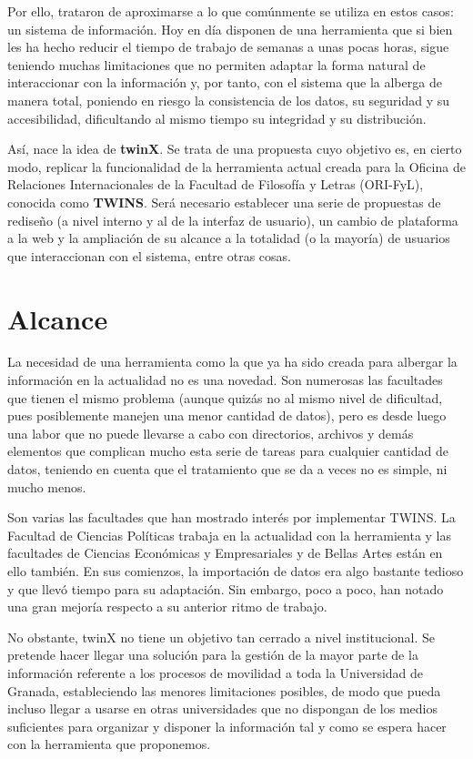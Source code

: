 Por ello, trataron de aproximarse a lo que comúnmente se utiliza en estos casos: un sistema de información. Hoy en día disponen de una herramienta que si bien les ha hecho reducir el tiempo de trabajo de semanas a unas pocas horas, sigue teniendo muchas limitaciones que no permiten adaptar la forma natural de interaccionar con la información y, por tanto, con el sistema que la alberga de manera total, poniendo en riesgo la consistencia de los datos, su seguridad y su accesibilidad, dificultando al mismo tiempo su integridad y su distribución.

Así, nace la idea de \textbf{twinX}. Se trata de una propuesta cuyo objetivo es, en cierto modo, replicar la funcionalidad de la herramienta actual creada para la Oficina de Relaciones Internacionales de la Facultad de Filosofía y Letras (ORI-FyL), conocida como \textbf{TWINS}. Será necesario establecer una serie de propuestas de rediseño (a nivel interno y al de la interfaz de usuario), un cambio de plataforma a la web y la ampliación de su alcance a la totalidad (o la mayoría) de usuarios que interaccionan con el sistema, entre otras cosas.

\section{Alcance}

La necesidad de una herramienta como la que ya ha sido creada para albergar la información en la actualidad no es una novedad. Son numerosas las facultades que tienen el mismo problema (aunque quizás no al mismo nivel de dificultad, pues posiblemente manejen una menor cantidad de datos), pero es desde luego una labor que no puede llevarse a cabo con directorios, archivos y demás elementos que complican mucho esta serie de tareas para cualquier cantidad de datos, teniendo en cuenta que el tratamiento que se da a veces no es simple, ni mucho menos.

Son varias las facultades que han mostrado interés por implementar TWINS. La Facultad de Ciencias Políticas trabaja en la actualidad con la herramienta y las facultades de Ciencias Económicas y Empresariales y de Bellas Artes están en ello también. En sus comienzos, la importación de datos era algo bastante tedioso y que llevó tiempo para su adaptación. Sin embargo, poco a poco, han notado una gran mejoría respecto a su anterior ritmo de trabajo.

No obstante, twinX no tiene un objetivo tan cerrado a nivel institucional. Se pretende hacer llegar una solución para la gestión de la mayor parte de la información referente a los procesos de movilidad a toda la Universidad de Granada, estableciendo las menores limitaciones posibles, de modo que pueda incluso llegar a usarse en otras universidades que no dispongan de los medios suficientes para organizar y disponer la información tal y como se espera hacer con la herramienta que proponemos.

